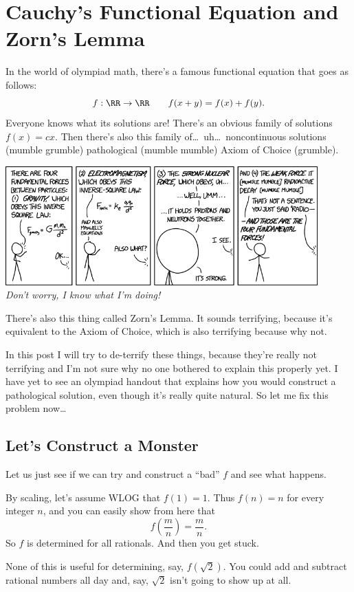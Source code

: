 \chapter{Cauchy's Functional Equation and Zorn's Lemma}
In the world of olympiad math, there's a famous functional equation that goes as follows: 
\[ f : \RR \to \RR \qquad f(x+y) = f(x) + f(y). \]
Everyone knows what its solutions are!
There's an obvious family of solutions $f(x) = cx$.
Then there's also this family of\dots\ uh\dots\ noncontinuous solutions (mumble grumble) pathological 
(mumble mumble) Axiom of Choice (grumble).

\begin{center}
	\includegraphics[width=12cm]{media/xkcd-fundamental-forces.png} \\[1em]
	\emph{Don't worry, I know what I'm doing!}
\end{center}

There's also this thing called Zorn's Lemma. It sounds terrifying,
because it's equivalent to the Axiom of Choice, which is also terrifying because why not.

In this post I will try to de-terrify these things,
because they're really not terrifying
and I'm not sure why no one bothered to explain this properly yet.
I have yet to see an olympiad handout that explains how you would construct
a pathological solution, even though it's really quite natural.
So let me fix this problem now\dots

\section{Let's Construct a Monster}
Let us just see if we can try and construct a ``bad'' $f$ and see what happens.

By scaling, let's assume WLOG that $f(1) = 1$.
Thus $f(n) = n$ for every integer $n$, and you can easily show from here that
\[ f\left( \frac mn \right) = \frac mn. \]
So $f$ is determined for all rationals. And then you get stuck.

None of this is useful for determining, say, $f(\sqrt 2)$.
You could add and subtract rational numbers all day
and, say, $\sqrt 2$ isn't going to show up at all.

